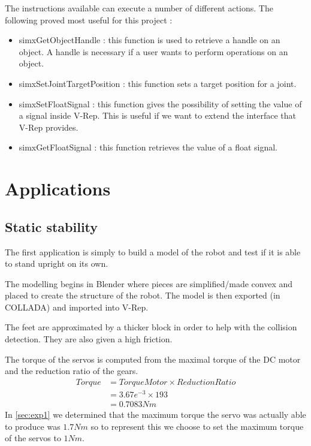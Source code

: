 The instructions available can execute a number of different actions. The following proved most useful for this project :\begin{itemize}
\item simxGetObjectHandle : this function is used to retrieve a handle on an object. A handle is necessary if a user wants to perform operations on an object.
\item simxSetJointTargetPosition : this function sets a target position for a joint.
\item simxSetFloatSignal : this function gives the possibility of setting the value of a signal inside V-Rep. This is useful if we want to extend the interface that V-Rep provides.
\item simxGetFloatSignal : this function retrieves the value of a float signal. 
\end{itemize}



\section{Applications}
\subsection{Static stability}
The first application is simply to build a model of the robot and test if it is able to stand upright on its own.

The modelling begins in Blender where pieces are simplified/made convex and placed to create the structure of the robot. The model is then exported (in COLLADA) and imported into V-Rep. 

The feet are approximated by a thicker block in order to help with the collision detection. They are also given a high friction.

The torque of the servos is computed from the maximal torque of the DC motor and the reduction ratio of the gears. 
\begin{align*}
Torque &= TorqueMotor \times ReductionRatio\\
&= 3.67e^{-3} \times 193\\
&= 0.7083Nm
\end{align*}
In \cref{sec:exp1} we determined that the maximum torque the servo was actually able to produce was $1.7Nm$ so to represent this we choose to set the maximum torque of the servos to $1Nm$.

